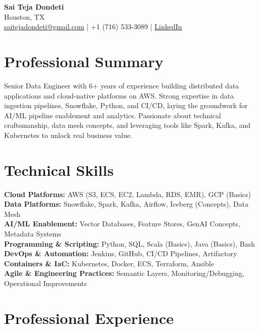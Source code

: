 \documentclass[10pt]{article}
\begin{document}
\begin{center}
    {\LARGE \textbf{Sai Teja Dondeti}} \\
    \vspace{2pt}
    Houston, TX \\
    \href{mailto:saitejadondeti@gmail.com}{saitejadondeti@gmail.com} \;|\;
    +1 (716) 533-3089 \;|\;
    \href{https://www.linkedin.com/in/sai-teja-dondeti/}{LinkedIn}
\end{center}

\section*{Professional Summary}
Senior Data Engineer with 6+ years of experience building distributed data applications and cloud-native platforms on AWS. Strong expertise in data ingestion pipelines, Snowflake, Python, and CI/CD, laying the groundwork for AI/ML pipeline enablement and analytics. Passionate about technical craftsmanship, data mesh concepts, and leveraging tools like Spark, Kafka, and Kubernetes to unlock real business value.

\section*{Technical Skills}

\textbf{Cloud Platforms:} AWS (S3, ECS, EC2, Lambda, RDS, EMR), GCP (Basics) \\
\textbf{Data Platforms:} Snowflake, Spark, Kafka, Airflow, Iceberg (Concepts), Data Mesh \\
\textbf{AI/ML Enablement:} Vector Databases, Feature Stores, GenAI Concepts, Metadata Systems \\
\textbf{Programming \& Scripting:} Python, SQL, Scala (Basics), Java (Basics), Bash \\
\textbf{DevOps \& Automation:} Jenkins, GitHub, CI/CD Pipelines, Artifactory \\
\textbf{Containers \& IaC:} Kubernetes, Docker, ECS, Terraform, Ansible \\
\textbf{Agile \& Engineering Practices:} Semantic Layers, Monitoring/Debugging, Operational Improvements

\section*{Professional Experience}
\end{document}
